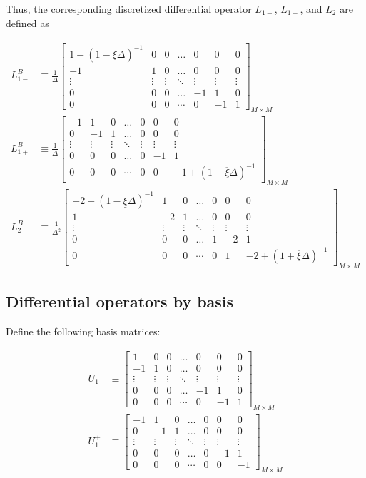 \documentclass[11pt]{article}
\theoremstyle{definition}
\begin{document}
Thus, the corresponding discretized differential operator $L_{1-}$, $L_{1+}$, and $L_2$ are defined as

\begin{align}
L_{1-}^B &\equiv \frac{1}{\Delta}\begin{bmatrix}
1 - (1 - \underline{\xi} \Delta)^{-1} &0&0&\dots&0&0&0\\
-1&1&0&\dots&0&0&0\\
\vdots&\vdots&\vdots&\ddots&\vdots&\vdots&\vdots\\
0&0&0&\dots&-1&1&0\\
0&0&0&\cdots&0&-1&1
\end{bmatrix}_{M\times M} \\
L_{1+}^B &\equiv \frac{1}{\Delta}\begin{bmatrix}
-1&1&0&\dots&0&0&0\\
0&-1&1&\dots&0&0&0\\
\vdots&\vdots&\vdots&\ddots&\vdots&\vdots&\vdots\\
0&0&0&\dots&0&-1&1\\
0&0&0&\cdots&0&0&-1+(1-\overline{\xi} \Delta)^{-1}
\end{bmatrix}_{M\times M} \\
L_2^B &\equiv \frac{1}{\Delta^2}\begin{bmatrix}
-2 - (1 - \underline{\xi}\Delta)^{-1} &1&0&\dots&0&0&0\\
1&-2&1&\dots&0&0&0\\
\vdots&\vdots&\vdots&\ddots&\vdots&\vdots&\vdots\\
0&0&0&\dots&1&-2&1\\
0&0&0&\cdots&0&1&-2 + (1 + \overline{\xi}\Delta)^{-1}
\end{bmatrix}_{M\times M}
\end{align}


\iffalse
\subsection{Differential operators by basis}
Define the following basis matrices:

\begin{align}
U_1^{-} &\equiv \begin{bmatrix}
1  &0&0&\dots&0&0&0\\
-1&1&0&\dots&0&0&0\\
\vdots&\vdots&\vdots&\ddots&\vdots&\vdots&\vdots\\
0&0&0&\dots&-1&1&0\\
0&0&0&\cdots&0&-1&1
\end{bmatrix}_{M\times M}\label{eq:L-1-basis} \\
U_1^{+} &\equiv \begin{bmatrix}
-1  &1&0&\dots&0&0&0\\
0&-1&1&\dots&0&0&0\\
\vdots&\vdots&\vdots&\ddots&\vdots&\vdots&\vdots\\
0&0&0&\dots&0&-1&1\\
0&0&0&\cdots&0&0&-1
\end{bmatrix}_{M\times M}\label{eq:L-1+-basis} \\
\end{align}
\end{document}
